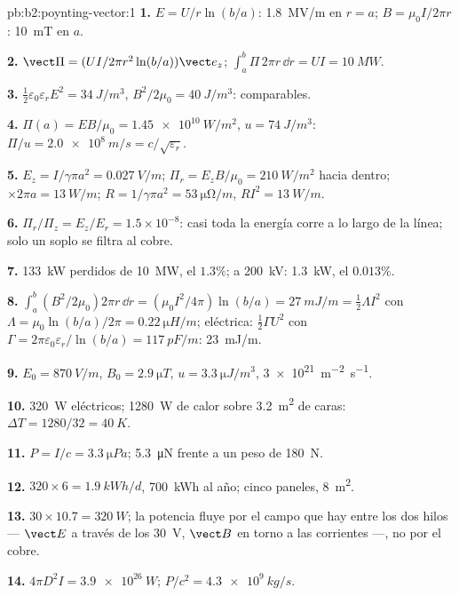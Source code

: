 \begin{solution}{pb:b2:poynting-vector:1}
\textbf{1.} $E = U/r\ln(b/a)$: \qty{1.8}{MV/m} en $r = a$; $B = \mu_0I/2\pi r$:
\qty{10}{mT} en $a$.

\textbf{2.} $\vect\Pi = (UI/2\pi r^2\ln(b/a))\vect e_z$; $\int_a^b\Pi\,2\pi r\,\dd r = UI =
\qty{10}{MW}$.

\textbf{3.} $\tfrac12\varepsilon_0\varepsilon_rE^2 = \qty{34}{J/m^3}$, $B^2/2\mu_0 = \qty{40}{J/m^3}$:
comparables.

\textbf{4.} $\Pi(a) = EB/\mu_0 = \qty{1.45e10}{W/m^2}$, $u = \qty{74}{J/m^3}$: $\Pi/u =
\qty{2.0e8}{m/s} = c/\sqrt{\varepsilon_r}$.

\textbf{5.} $E_z = I/\gamma\pi a^2 = \qty{0.027}{V/m}$; $\Pi_r = E_zB/\mu_0 = \qty{210}{W/m^2}$
hacia dentro; $\times2\pi a = \qty{13}{W/m}$; $R = 1/\gamma\pi a^2 = \qty{53}{\micro\ohm/m}$, $RI^2 =
\qty{13}{W/m}$.

\textbf{6.} $\Pi_r/\Pi_z = E_z/E_r = 1.5 \times 10^{-8}$: casi toda la energía
corre a lo largo de la línea; solo un soplo se filtra al cobre.

\textbf{7.} \qty{133}{kW} perdidos de \qty{10}{MW}, el $1.3\%$; a \qty{200}{kV}: \qty{1.3}{kW},
el $0.013\%$.

\textbf{8.} $\int_a^b(B^2/2\mu_0)2\pi r\,\dd r = (\mu_0I^2/4\pi)\ln(b/a) = \qty{27}{mJ/m} =
\tfrac12\Lambda I^2$ con $\Lambda = \mu_0\ln(b/a)/2\pi = \qty{0.22}{\micro H/m}$; eléctrica:
$\tfrac12\Gamma U^2$ con $\Gamma = 2\pi\varepsilon_0\varepsilon_r/\ln(b/a) = \qty{117}{pF/m}$: \qty{23}{mJ/m}.

\textbf{9.} $E_0 = \qty{870}{V/m}$, $B_0 = \qty{2.9}{\micro T}$, $u = \qty{3.3}{\micro J/m^3}$,
\qty{3e21}{m^{-2}.s^{-1}}.

\textbf{10.} \qty{320}{W} eléctricos; \qty{1280}{W} de calor sobre \qty{3.2}{m^2} de
caras: $\Delta T = 1280/32 = \qty{40}{K}$.

\textbf{11.} $P = I/c = \qty{3.3}{\micro Pa}$; \qty{5.3}{\micro N} frente a un peso de
\qty{180}{N}.

\textbf{12.} $320 \times 6 = \qty{1.9}{kWh/d}$, \qty{700}{kWh} al año; cinco paneles,
\qty{8}{m^2}.

\textbf{13.} $30 \times 10.7 = \qty{320}{W}$; la potencia fluye por el campo que
hay entre los dos hilos --- $\vect E$ a través de los \qty{30}{V}, $\vect B$ en
torno a las corrientes ---, no por el cobre.

\textbf{14.} $4\pi D^2I = \qty{3.9e26}{W}$; $P/c^2 = \qty{4.3e9}{kg/s}$.


\end{solution}
